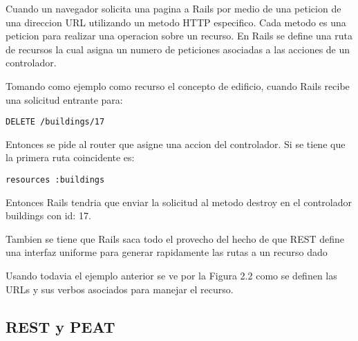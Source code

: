 Cuando un navegador solicita una pagina a Rails por medio de una peticion de una direccion URL utilizando un metodo HTTP especifico. Cada metodo es una peticion para realizar una operacion sobre un recurso. En Rails se define una ruta de recursos la cual asigna un numero de peticiones asociadas a las acciones de un controlador.

Tomando como ejemplo como recurso el concepto de edificio, cuando Rails recibe una
solicitud entrante para:

\begin{verbatim}
DELETE /buildings/17
\end{verbatim}

Entonces se pide al router que asigne una accion del controlador. Si se tiene
que la primera ruta coincidente es:

\begin{verbatim}
resources :buildings
\end{verbatim}

Entonces Rails tendria que enviar la solicitud al metodo destroy en el controlador
buildings con {id: 17}.

Tambien se tiene que Rails saca todo el provecho del hecho de que REST define
una interfaz uniforme para generar rapidamente las rutas a un recurso dado

Usando todavia el ejemplo anterior se ve por la Figura 2.2 como se definen
las URLs y sus verbos asociados para manejar el recurso.


\subsection{REST y PEAT}
